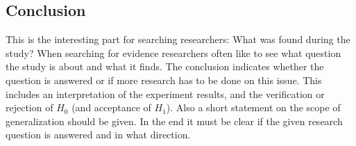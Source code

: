 \subsection{Conclusion}
\label{subsec:conclusion}

This is the interesting part for searching researchers: What was found during the study? When searching for evidence researchers often like to see what question the study is about and what it finds. The conclusion indicates whether the question is answered or if more research has to be done on this issue. This includes an interpretation of the experiment results, and the verification or rejection of $H_0$ (and acceptance of $H_1$). Also a short statement on the scope of generalization should be given. In the end it must be clear if the given research question is answered and in what direction. 